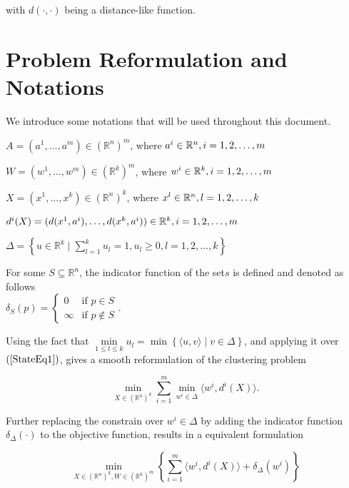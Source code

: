 \documentclass[11pt]{article}
\numberwithin{equation}{section}
\begin{document}
\noindent with $\textit{d}(\cdot ,\cdot)$ being a distance-like function.


\section{Problem Reformulation and Notations}

We introduce some notations that will be used throughout this document.

\noindent $A = (a^1, \ldots , a^m) \in \left(\mathbb{R}^n\right)^m$, where $a^i \in \mathbb{R}^n,\smallskip i=1, 2, \ldots , m$

\noindent $W = (w^1, \ldots , w^m) \in \left(\mathbb{R}^k\right)^m$, where $w^i \in \mathbb{R}^k,\smallskip i=1, 2, \ldots , m$

\noindent $X = (x^1, \ldots , x^k) \in \left(\mathbb{R}^n\right)^k$, where $x^l \in \mathbb{R}^n,\smallskip l=1, 2, \ldots , k$

\noindent $d^{i}(X) = (d(x^1,a^i), \ldots , d(x^k,a^i)) \in \mathbb{R}^k,\smallskip i=1, 2, \ldots , m$

\noindent $\Delta = \left\lbrace u \in \mathbb{R}^k \mid \sum\limits_{l=1}^{k} u_l = 1, u_l \geq 0 , l=1, 2, \ldots ,k \right\rbrace$

\noindent For some $S \subseteq \mathbb{R}^n$, the indicator function of the set$s$ is defined and denoted as follows \\ $\delta_S(p) = \begin{cases} 0 &\mbox{if } p \in S \\ 
\infty &\mbox{if } p \not\in S \end{cases}.$

Using the fact that $\min\limits_{1 \leq l \leq k} u_l = \min \left\lbrace \langle u,v \rangle \mid v \in \Delta \right\rbrace$, and applying it over $\left(\ref{StateEq1}\right)$, gives a smooth reformulation of the clustering problem

\begin{equation}
	\min\limits_{X \in \left(\mathbb{R}^n\right)^k} \sum\limits_{i=1}^{m} \min\limits_{w^i \in \Delta} \langle w^i , d^i(X) \rangle. \label{StateEq2}
\end{equation}

Further replacing the constrain over $w^i \in \Delta$ by adding the indicator function $\delta_{\Delta}(\cdot)$ to the objective function, results in a equivalent formulation

\begin{equation}
	\min\limits_{X \in \left(\mathbb{R}^n\right)^k , W \in \left(\mathbb{R}^k\right)^m} \left\lbrace \sum\limits_{i=1}^{m} \langle w^i , d^i(X) \rangle + \delta_{\Delta}(w^i) \right\rbrace \label{StateEq3}
\end{equation}
\end{document}
